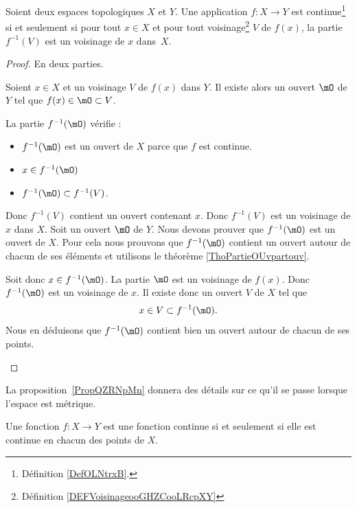 \begin{proposition}       \label{PROPooOXBCooIzLaPe}
	Soient deux espaces topologiques \( X\) et \( Y\). Une application \( f\colon X\to Y\) est continue\footnote{Définition \ref{DefOLNtrxB}.} si et seulement si pour tout \( x\in X\) et pour tout voisinage\footnote{Définition \ref{DEFVoisinageooGHZCooLRcpXY}} \( V\) de \( f(x)\), la partie \( f^{-1}(V)\) est un voisinage de \( x\) dans~\( X\).
\end{proposition}

\begin{proof}
	En deux parties.
	\begin{subproof}
		\spitem[\( \Rightarrow\)]
		Soient \( x\in X\) et un voisinage \( V\) de \( f(x)\) dans \( Y\). Il existe alors un ouvert \( \mO\) de \( Y\) tel que \( f(x)\in \mO\subset V\).

		La partie \( f^{-1}(\mO)\) vérifie :
		\begin{itemize}
			\item \( f^{-1}(\mO)\) est un ouvert de \( X\) parce que \( f\) est continue.
			\item \( x\in f^{-1}(\mO)\)
			\item \( f^{-1}(\mO)\subset f^{-1}(V)\).
		\end{itemize}
		Donc \( f^{-1}(V)\) contient un ouvert contenant \( x\). Donc \( f^{-1}(V)\) est un voisinage de \( x\) dans \( X\).
		\spitem[\( \Leftarrow\)]
		Soit un ouvert \( \mO\) de \( Y\). Nous devons prouver que \( f^{-1}(\mO)\) est un ouvert de \( X\). Pour cela nous prouvons que \( f^{-1}(\mO)\) contient un ouvert autour de chacun de ses éléments et utilisons le théorème \ref{ThoPartieOUvpartouv}.

		Soit donc \( x\in f^{-1}(\mO)\). La partie \( \mO\) est un voisinage de \( f(x)\). Donc \( f^{-1}(\mO)\) est un voisinage de \( x\). Il existe donc un ouvert \( V\) de \( X\) tel que
		\begin{equation}
			x\in V\subset f^{-1}(\mO).
		\end{equation}
		Nous en déduisons que \( f^{-1}(\mO)\) contient bien un ouvert autour de chacun de ses points.
	\end{subproof}
\end{proof}

La proposition~\ref{PropQZRNpMn} donnera des détails sur ce qu'il se passe lorsque l'espace est métrique.

\begin{theorem} \label{ThoESCaraB}
	Une fonction \( f\colon X\to Y\) est une fonction continue si et seulement si elle est continue en chacun des points de \( X\).
\end{theorem}

